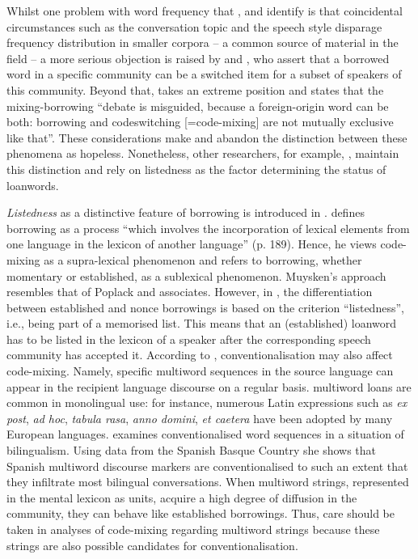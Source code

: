 Whilst one problem with word frequency that \citet[49]{haust-codeswitching-1995}, \citet[57]{boumans-syntax-1998} and \citet[46]{muhamedowa-untersuchung-2006} identify is that coincidental circumstances such as the conversation topic and the speech style disparage frequency distribution in smaller corpora -- a common source of material in the field -- a more serious objection is raised by \citet[57]{boumans-syntax-1998} and \citet{backus-13}, who assert that a borrowed word in a specific community can be a switched item for a subset of speakers of this community. Beyond that, \citet[][29]{backus-13} takes an extreme position and states that the mixing-borrowing ``debate is misguided, because a foreign-origin word can be both: borrowing and codeswitching [=code-mixing] are not mutually exclusive like that''. These considerations make \citet[96--97]{backus-two-1996} and \citet[58--60]{boumans-syntax-1998} abandon the distinction between these phenomena as hopeless. Nonetheless, other researchers, for example,  \citet[][]{muhamedowa-untersuchung-2006}, maintain this distinction and rely on listedness as the factor determining the status of loanwords.

\begin{sloppypar}
\textit{Listedness} as a distinctive feature of borrowing is introduced in \citet{milroy-code-switching-1995}. \citet{milroy-code-switching-1995} defines borrowing as a process ``which involves the incorporation of lexical elements from one language in the lexicon of another language'' (p. 189). Hence, he views code-mixing as a supra-lexical phenomenon and refers to borrowing, whether momentary or established, as a sublexical phenomenon. Muysken's approach resembles that of Poplack and associates. However, in \citet{milroy-code-switching-1995, muysken-bilingual-2000}, the differentiation between established and nonce borrowings is based on the criterion ``listedness'', i.e., being part of a memorised list. This means that an (established) loanword has to be listed in the lexicon of a speaker after the corresponding speech community has accepted it. According to \citet{milroy-code-switching-1995, muysken-bilingual-2000}, conventionalisation may also affect code-mixing. Namely, specific multiword sequences in the source language can appear in the recipient language discourse on a regular basis. multiword loans are common in monolingual use: for instance, numerous Latin expressions such as \textit{ex post}, \textit{ad hoc}, \textit{tabula rasa}, \textit{anno domini}, \textit{et caetera} have been adopted by many European languages. \citet{lantto2015} examines conventionalised word sequences in a situation of bilingualism. Using data from the Spanish Basque Country she shows that Spanish multiword discourse markers are conventionalised to such an extent that they infiltrate most bilingual conversations. When multiword strings, represented in the mental lexicon as units, acquire a high degree of diffusion in the community, they can behave like established borrowings. Thus, care should be taken in analyses of code-mixing regarding multiword strings because these strings are also possible candidates for conventionalisation.
\end{sloppypar}

